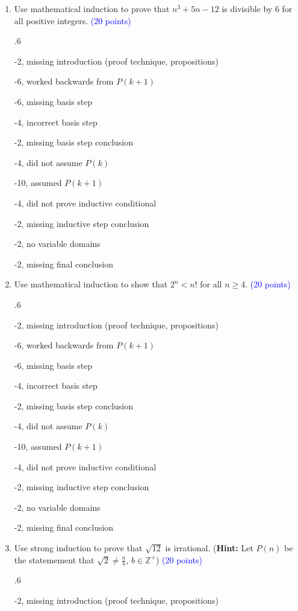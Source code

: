 \documentclass{article}
\newcommand{\pt}[1]{\textcolor{blue}{(#1 points)}}
\newenvironment{rubric}
{
\par
\begin{spacing}{.6}
\begin{itshape}
\color{red}

}
{
\end{itshape}
\end{spacing}
\par
}
\begin{document}
\clearpage
\begin{enumerate}



\item Use mathematical induction to prove that $n^3 +5n -12$ is divisible by $6$ for all positive integers. \pt{20}

\begin{rubric}
-2, missing introduction (proof technique, propositions)

-6, worked backwards from $P(k+1)$

-6, missing basis step

-4, incorrect basis step

-2, missing basis step conclusion

-4, did not assume $P(k)$

-10, assumed $P(k+1)$

-4, did not prove inductive conditional

-2, missing inductive step conclusion

-2, no variable domains

-2, missing final conclusion
\end{rubric}

\item Use mathematical induction to show that $2^n < n!$ for all $n \geq 4$. \pt{20}

\begin{rubric}
-2, missing introduction (proof technique, propositions)

-6, worked backwards from $P(k+1)$

-6, missing basis step

-4, incorrect basis step

-2, missing basis step conclusion

-4, did not assume $P(k)$

-10, assumed $P(k+1)$

-4, did not prove inductive conditional

-2, missing inductive step conclusion

-2, no variable domains

-2, missing final conclusion
\end{rubric}

\item Use strong induction to prove that $\sqrt{12}$ is irrational. (\textbf{Hint:} Let $P(n)$ be the statemement that $\sqrt{2} \neq \frac{n}{b}$, $b \in \mathbb{Z}^+$) \pt{20}

\begin{rubric}
-2, missing introduction (proof technique, propositions)


\end{rubric}
\end{enumerate}
\end{document}

